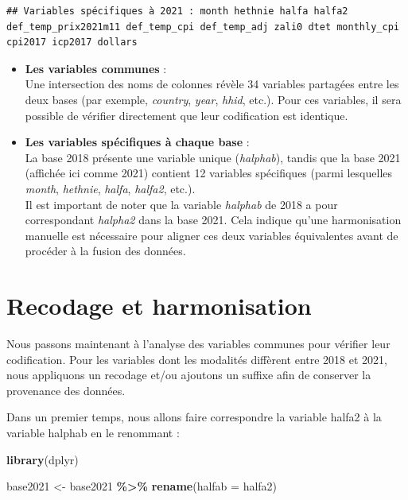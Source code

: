 \documentclass[
]{article}
\newenvironment{Shaded}{\begin{snugshade}}{\end{snugshade}}
\newcommand{\AttributeTok}[1]{\textcolor[rgb]{0.13,0.29,0.53}{#1}}
\newcommand{\FunctionTok}[1]{\textcolor[rgb]{0.13,0.29,0.53}{\textbf{#1}}}
\newcommand{\NormalTok}[1]{#1}
\newcommand{\OtherTok}[1]{\textcolor[rgb]{0.56,0.35,0.01}{#1}}
\newcommand{\SpecialCharTok}[1]{\textcolor[rgb]{0.81,0.36,0.00}{\textbf{#1}}}
\begin{document}
\begin{verbatim}
## Variables spécifiques à 2021 : month hethnie halfa halfa2 def_temp_prix2021m11 def_temp_cpi def_temp_adj zali0 dtet monthly_cpi cpi2017 icp2017 dollars
\end{verbatim}

\begin{itemize}
\item
  \textbf{Les variables communes} :\\
  Une intersection des noms de colonnes révèle 34 variables partagées
  entre les deux bases (par exemple, \emph{country}, \emph{year},
  \emph{hhid}, etc.). Pour ces variables, il sera possible de vérifier
  directement que leur codification est identique.
\item
  \textbf{Les variables spécifiques à chaque base} :\\
  La base 2018 présente une variable unique (\emph{halphab}), tandis que
  la base 2021 (affichée ici comme 2021) contient 12 variables
  spécifiques (parmi lesquelles \emph{month}, \emph{hethnie},
  \emph{halfa}, \emph{halfa2}, etc.).\\
  Il est important de noter que la variable \emph{halphab} de 2018 a
  pour correspondant \emph{halpha2} dans la base 2021. Cela indique
  qu'une harmonisation manuelle est nécessaire pour aligner ces deux
  variables équivalentes avant de procéder à la fusion des données.
\end{itemize}

\hypertarget{recodage-et-harmonisation}{%
\section{Recodage et harmonisation}\label{recodage-et-harmonisation}}

Nous passons maintenant à l'analyse des variables communes pour vérifier
leur codification. Pour les variables dont les modalités diffèrent entre
2018 et 2021, nous appliquons un recodage et/ou ajoutons un suffixe afin
de conserver la provenance des données.

Dans un premier temps, nous allons faire correspondre la variable halfa2
à la variable halphab en le renommant :

\begin{Shaded}
\begin{Highlighting}[]
\FunctionTok{library}\NormalTok{(dplyr)}

\NormalTok{base2021 }\OtherTok{\textless{}{-}}\NormalTok{ base2021 }\SpecialCharTok{\%\textgreater{}\%} 
  \FunctionTok{rename}\NormalTok{(}\AttributeTok{halfab =}\NormalTok{ halfa2)}
\end{Highlighting}
\end{Shaded}
\end{document}
